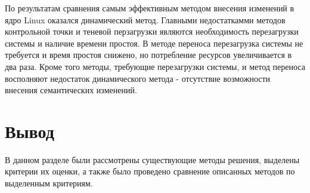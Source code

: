 По результатам сравнения самым эффективным методом внесения изменений в ядро Linux оказался динамический метод. Главными недостаткамми методов контрольной точки и теневой перзагрузки являются необходимость перезагрузки системы и наличие времени простоя. В методе переноса перезагрузка системы не требуется и время простоя снижено, но потребление ресурсов увеличивается в два раза. Кроме того методы, требующие перезагрузки системы, и метод переноса восполняют недостаток динамического метода - отсутствие возможности внесения семантических изменений.

\section{Вывод}

В данном разделе были рассмотрены существующие методы решения, выделены критерии их оценки, а также было проведено сравнение описанных методов по выделенным критериям.
